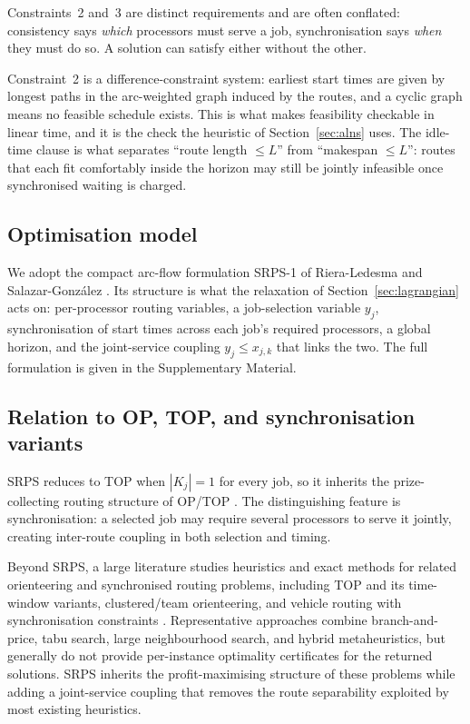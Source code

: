 \documentclass[preprint,12pt]{elsarticle}
\begin{document}
Constraints~2 and~3 are distinct requirements and are often conflated: consistency
says \emph{which} processors must serve a job, synchronisation says \emph{when}
they must do so. A solution can satisfy either without the other.

Constraint~2 is a difference-constraint system: earliest start times are given by
longest paths in the arc-weighted graph induced by the routes, and a cyclic graph
means no feasible schedule exists. This is what makes feasibility checkable in
linear time, and it is the check the heuristic of Section~\ref{sec:alns} uses. The
idle-time clause is what separates ``route length $\le L$'' from ``makespan $\le
L$'': routes that each fit comfortably inside the horizon may still be jointly
infeasible once synchronised waiting is charged.

\subsection{Optimisation model}

We adopt the compact arc-flow formulation SRPS-1 of Riera-Ledesma and
Salazar-Gonz\'alez \cite{RieraLedesma2021SRPS}. Its structure is what the
relaxation of Section~\ref{sec:lagrangian} acts on: per-processor routing
variables, a job-selection variable $y_j$, synchronisation of start times
across each job's required processors, a global horizon, and the joint-service
coupling $y_j \le x_{j,k}$ that links the two. The full formulation is given in the Supplementary Material.

\subsection{Relation to OP, TOP, and synchronisation variants}

SRPS reduces to TOP when $|K_j|=1$ for every job, so it inherits the prize-collecting routing structure of OP/TOP \cite{Vansteenwegen2011Orienteering}. The distinguishing feature is synchronisation: a selected job may require several processors to serve it jointly, creating inter-route coupling in both selection and timing.

Beyond SRPS, a large literature studies heuristics and exact methods for related orienteering and synchronised routing problems, including TOP and its time-window variants, clustered/team orienteering, and vehicle routing with synchronisation constraints \cite{Drexl2012SurveySync,Afifi2016COPTW}. Representative approaches combine branch-and-price, tabu search, large neighbourhood search, and hybrid metaheuristics, but generally do not provide per-instance optimality certificates for the returned solutions. SRPS inherits the profit-maximising structure of these problems while adding a joint-service coupling that removes the route separability exploited by most existing heuristics.
\end{document}
